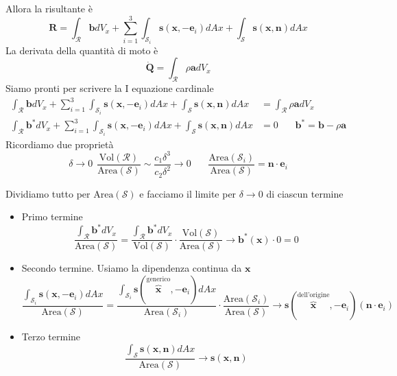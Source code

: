 \documentclass[10pt,a4paper,twoside]{book}
\begin{document}
Allora la risultante è
\begin{equation*}
\mathbf{R} =\int _{\mathcal{R}}\mathbf{b} dV_{x} +\sum\limits ^{3}_{i=1}\int _{\mathcal{S}_{i}}\mathbf{s}(\mathbf{x} ,-\mathbf{e}_{i}) dAx+\int _{\mathcal{S}}\mathbf{s}(\mathbf{x} ,\mathbf{n}) dAx
\end{equation*}
La derivata della quantità di moto è
\begin{equation*}
\dot{\mathbf{Q}} =\int _{\mathcal{R}} \rho \mathbf{a} dV_{x}
\end{equation*}
Siamo pronti per scrivere la I equazione cardinale
\begin{align*}
\int _{\mathcal{R}}\mathbf{b} dV_{x} +\sum\limits ^{3}_{i=1}\int _{\mathcal{S}_{i}}\mathbf{s}(\mathbf{x} ,-\mathbf{e}_{i}) dAx+\int _{\mathcal{S}}\mathbf{s}(\mathbf{x} ,\mathbf{n}) dAx & =\int _{\mathcal{R}} \rho \mathbf{a} dV_{x}\\
\int _{\mathcal{R}}\mathbf{b}^{*} dV_{x} +\sum\limits ^{3}_{i=1}\int _{\mathcal{S}_{i}}\mathbf{s}(\mathbf{x} ,-\mathbf{e}_{i}) dAx+\int _{\mathcal{S}}\mathbf{s}(\mathbf{x} ,\mathbf{n}) dAx & =0\ \ \ \ \ \ \ \ \mathbf{b^{*}} =\mathbf{b} -\rho \mathbf{a}
\end{align*}
Ricordiamo due proprietà
\begin{equation*}
\delta \rightarrow 0\ \ \frac{\mathrm{Vol}(\mathcal{R})}{\mathrm{Area}(\mathcal{S})} \sim \frac{c_{1} \delta ^{3}}{c_{2} \delta ^{2}}\rightarrow 0\ \ \ \ \ \ \ \ \frac{\mathrm{Area}(\mathcal{S}_{i})}{\mathrm{Area}(\mathcal{S})} =\mathbf{n} \cdotp \mathbf{e}_{i}
\end{equation*}


Dividiamo tutto per $\mathrm{Area}(\mathcal{S})$ e facciamo il limite per $\delta \rightarrow 0$ di ciascun termine
\begin{itemize}
\item Primo termine\begin{equation*}
\frac{\int _{\mathcal{R}}\mathbf{b}^{*} dV_{x}}{\mathrm{Area}(\mathcal{S})} =\frac{\int _{\mathcal{R}}\mathbf{b}^{*} dV_{x}}{\mathrm{Vol}(\mathcal{S})} \cdotp \frac{\mathrm{Vol}(\mathcal{S})}{\mathrm{Area}(\mathcal{S})}\rightarrow \mathbf{b}^{*}(\mathbf{x}) \cdotp 0=0
\end{equation*}
\item Secondo termine. Usiamo la dipendenza continua da $\mathbf{x}$\begin{equation*}
\frac{\int _{\mathcal{S}_{i}}\mathbf{s}(\mathbf{x} ,-\mathbf{e}_{i}) dAx}{\mathrm{Area}(\mathcal{S})} =\frac{\int _{\mathcal{S}_{i}}\mathbf{s}\left(\overbrace{\mathbf{x}}^{\text{generico}} ,-\mathbf{e}_{i}\right) dAx}{\mathrm{Area}(\mathcal{S}_{i})} \cdotp \frac{\mathrm{Area}(\mathcal{S}_{i})}{\mathrm{Area}(\mathcal{S})}\rightarrow \mathbf{s}\left(\overbrace{\mathbf{x}}^{\text{dell'origine}} ,-\mathbf{e}_{i}\right)(\mathbf{n} \cdotp \mathbf{e}_{i})
\end{equation*}
\item Terzo termine\begin{equation*}
\frac{\int _{\mathcal{S}}\mathbf{s}(\mathbf{x} ,\mathbf{n}) dAx}{\mathrm{Area}(\mathcal{S})}\rightarrow \mathbf{s}(\mathbf{x} ,\mathbf{n})
\end{equation*}
\end{itemize}
\end{document}
